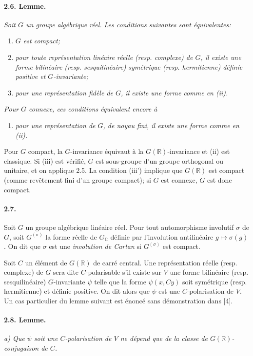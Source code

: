 \documentclass[10pt,leqno]{article}
\newcommand{\C}{\mathbb{C}}
\newcommand{\R}{\mathbb{R}}
\begin{document}
\paragraph{2.6. Lemme.} \emph{Soit $G$ un groupe algébrique réel. Les conditions suivantes sont équivalentes:}
\begin{enumerate}[label=(\roman*)]
\item \emph{$G$ est compact;}
\item \emph{pour toute représentation linéaire réelle (resp. complexe) de $G$, il existe une forme bilinéaire (resp. sesquilinéaire) symétrique (resp. hermitienne) définie positive et $G$-invariante;}
\item \emph{pour une représentation fidèle de $G$, il existe une forme comme en (ii).}
\end{enumerate}
\emph{Pour $G$ connexe, ces conditions équivalent encore à}
\begin{enumerate}[label=(iii\textquotesingle)]
\item \emph{pour une représentation de $G$, de noyau fini, il existe une forme comme en (ii).}
\end{enumerate}

Pour $G$ compact, la $G$-invariance équivaut à la $G(\R)$-invariance et (ii) est classique. Si (iii) est vérifié, $G$ est sous-groupe d'un groupe orthogonal ou unitaire, et on applique 2.5. La condition (iii') implique que $G(\R)$ est compact (comme revêtement fini d'un groupe compact); si $G$ est connexe, $G$ est donc compact.

\paragraph{2.7.} Soit $G$ un groupe algébrique linéaire réel. Pour tout automorphisme involutif $\sigma$ de $G$, soit $G^{(\sigma)}$ la forme réelle de $G_\C$ définie par l'involution antilinéaire $g\mapsto\sigma(\bar g)$. On dit que $\sigma$ est une \emph{involution de Cartan} si $G^{(\sigma)}$ est compact.

Soit $C$ un élément de $G(\R)$ de carré central. Une représentation réelle (resp. complexe) de $G$ sera dite \mbox{$C$-polarisable} s'il existe sur $V$ une forme bilinéaire (resp. sesquilinéaire) $G$-invariante $\psi$ telle que la forme $\psi(x,Cy)$ soit symétrique (resp. hermitienne) et définie positive. On dit alors que $\psi$ est une $C$-polarisation de $V$. Un cas particulier du lemme suivant est énoncé sans démonstration dans [4].

\paragraph{2.8. Lemme.} \emph{a) Que $\psi$ soit une $C$-polarisation de $V$ ne dépend que de la classe de $G(\R)$-conjugaison de $C$.}
\end{document}
